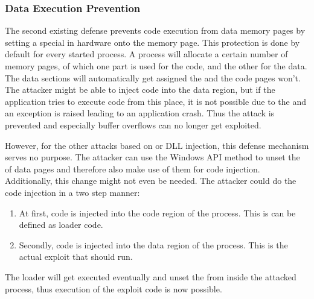 \subsubsection{Data Execution Prevention}
The second existing defense prevents code execution from data memory pages by setting a special  in hardware onto the memory page. This protection is done by default for every started process. A process will allocate a certain number of memory pages, of which one part is used for the code, and the other for the data. The data sections will automatically get assigned the  and the code pages won't. The attacker might be able to inject code into the data region, but if the application tries to execute code from this place, it is not possible due to the  and an exception is raised leading to an application crash. Thus the attack is prevented and especially buffer overflows can no longer get exploited.

However, for the other attacks based on  or DLL injection, this defense mechanism serves no purpose. The attacker can use the Windows API method  to unset the  of data pages and therefore also make use of them for code injection. Additionally, this change might not even be needed. The attacker could do the code injection in a two step manner: 
\begin{enumerate}
\item At first, code is injected into the code region of the process. This is can be defined as loader code.
\item Secondly, code is injected into the data region of the process. This is the actual exploit that should run.
\end{enumerate}
The loader will get executed eventually and unset the  from inside the attacked process, thus execution of the exploit code is now possible. 